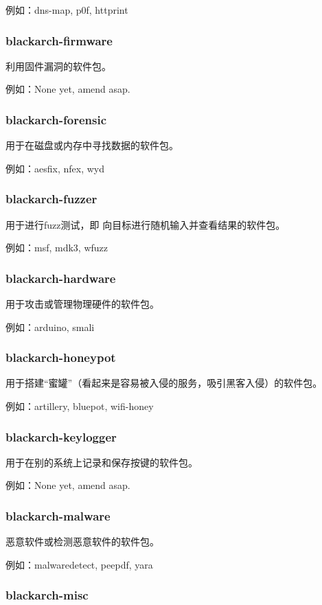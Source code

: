 \documentclass[a4paper, oneside, 11pt]{book}
\begin{document}
例如：dns-map, p0f, httprint

\subsubsection{blackarch-firmware}
利用固件漏洞的软件包。

例如：None yet, amend asap.

\subsubsection{blackarch-forensic}
用于在磁盘或内存中寻找数据的软件包。

例如：aesfix, nfex, wyd

\subsubsection{blackarch-fuzzer}
用于进行fuzz测试，即 向目标进行随机输入并查看结果的软件包。

例如：msf, mdk3, wfuzz

\subsubsection{blackarch-hardware}
用于攻击或管理物理硬件的软件包。

例如：arduino, smali

\subsubsection{blackarch-honeypot}
用于搭建“蜜罐”（看起来是容易被入侵的服务，吸引黑客入侵）的软件包。

例如：artillery, bluepot, wifi-honey

\subsubsection{blackarch-keylogger}
用于在别的系统上记录和保存按键的软件包。

例如：None yet, amend asap.

\subsubsection{blackarch-malware}
恶意软件或检测恶意软件的软件包。

例如：malwaredetect, peepdf, yara

\subsubsection{blackarch-misc}
\end{document}
